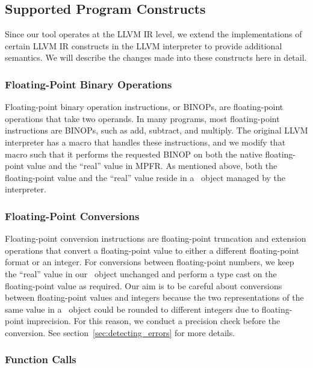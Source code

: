 \subsection{Supported Program Constructs}
\label{sec:constructs}

Since our tool operates at the LLVM IR level, we extend the implementations of certain LLVM IR constructs in the LLVM interpreter to provide additional semantics. We will describe the changes made into these constructs here in detail.

\subsubsection{Floating-Point Binary Operations}

Floating-point binary operation instructions, or BINOPs, are floating-point operations that take two operands. In many programs, most floating-point instructions are BINOPs, such as add, subtract, and multiply. The original LLVM interpreter has a macro that handles these instructions, and we modify that macro such that it performs the requested BINOP on both the native floating-point value and the ``real'' value in MPFR. As mentioned above, both the floating-point value and the ``real'' value reside in a \smartfloat~object managed by the interpreter.

\subsubsection{Floating-Point Conversions}

Floating-point conversion instructions are floating-point truncation and extension operations that convert a floating-point value to either a different floating-point format or an integer. For conversions between floating-point numbers, we keep the ``real'' value in our \smartfloat~object unchanged and perform a type cast on the floating-point value as required. Our aim is to be careful about conversions between floating-point values and integers because the two representations of the same value in a \smartfloat~object could be rounded to different integers due to floating-point imprecision. For this reason, we conduct a precision check before the conversion. See section~\ref{sec:detecting_errors} for more details.

\subsubsection{Function Calls}
\label{sec:func_calls}

